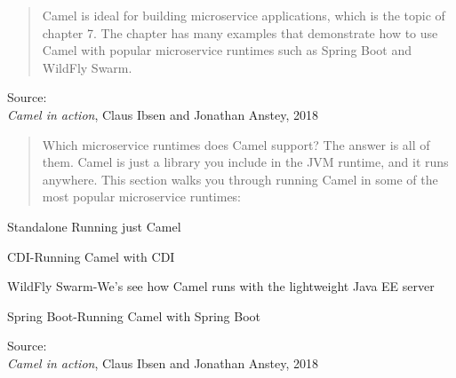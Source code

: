 \documentclass[Screen16to9,17pt]{foils}
\begin{document}

\begin{quote}
Camel is ideal for building microservice applications, which is the topic of
chapter 7. The chapter has many examples that demonstrate how to use Camel
with popular microservice runtimes such as Spring Boot and WildFly Swarm.
\end{quote}

Source: {\footnotesize\\
\emph{Camel in action}, Claus Ibsen and Jonathan Anstey, 2018}




\begin{quote}
  Which microservice runtimes does Camel support? The answer is all of them. Camel is
  just a library you include in the JVM runtime, and it runs anywhere. This section walks
  you through running Camel in some of the most popular microservice runtimes:
\end{quote}

\begin{list2}
\item Standalone Running just Camel
\item CDI-Running Camel with CDI
\item WildFly Swarm-We’s see how Camel runs with the lightweight Java EE server
\item Spring Boot-Running Camel with Spring Boot
\end{list2}

Source: {\footnotesize\\
\emph{Camel in action}, Claus Ibsen and Jonathan Anstey, 2018}




\slidenext
\end{document}
